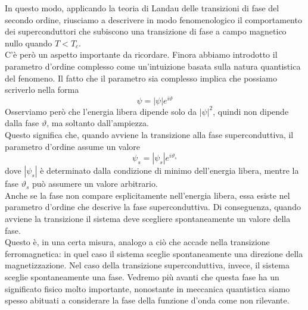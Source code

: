In questo modo, applicando la teoria di Landau delle transizioni di fase del secondo ordine, riusciamo a descrivere in modo fenomenologico il comportamento dei superconduttori che subiscono una transizione di fase a campo magnetico nullo quando $T<T_c$.\\
C'è però un aspetto importante da ricordare. Finora abbiamo introdotto il parametro d'ordine complesso come un'intuizione basata sulla natura quantistica del fenomeno. Il fatto che il parametro sia complesso implica che possiamo scriverlo nella forma\\
\begin{equation*}
   \psi = |\psi| e^{i\vartheta}
\end{equation*}
Osserviamo però che l'energia libera dipende solo da $|\psi|^2$, quindi non dipende dalla fase $\vartheta$, ma soltanto dall'ampiezza.\\
Questo significa che, quando avviene la transizione alla fase superconduttiva, il parametro d'ordine assume un valore
\begin{equation*}
   \psi_s = |\psi_s| e^{i\vartheta_s}
\end{equation*}
dove $|\psi_s|$ è determinato dalla condizione di minimo dell'energia libera, mentre la fase $\vartheta_s$ può assumere un valore arbitrario.\\
Anche se la fase non compare esplicitamente nell'energia libera, essa esiste nel parametro d'ordine che descrive la fase superconduttiva. Di conseguenza, quando avviene la transizione il sistema deve scegliere spontaneamente un valore della fase.\\
Questo è, in una certa misura, analogo a ciò che accade nella transizione ferromagnetica: in quel caso il sistema sceglie spontaneamente una direzione della magnetizzazione. Nel caso della transizione superconduttiva, invece, il sistema sceglie spontaneamente una fase. Vedremo più avanti che questa fase ha un significato fisico molto importante, nonostante in meccanica quantistica siamo spesso abituati a considerare la fase della funzione d'onda come non rilevante.
